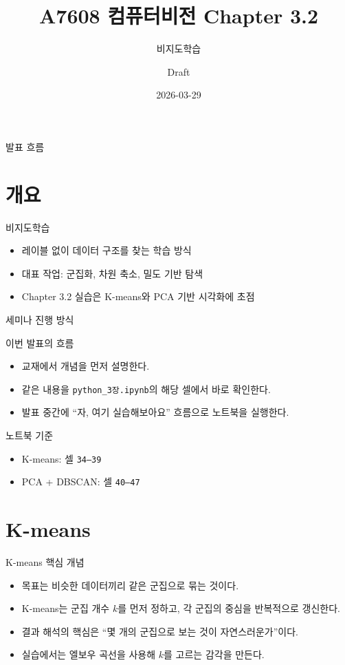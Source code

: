\documentclass[aspectratio=169]{beamer}
\title{A7608 컴퓨터비전 Chapter 3.2}
\subtitle{비지도학습}
\author{Draft}
\date{2026-03-29}
\begin{document}
\frame{\titlepage}

\begin{frame}{발표 흐름}
\tableofcontents
\end{frame}

\section{개요}
\begin{frame}{비지도학습}
\begin{itemize}
    \item 레이블 없이 데이터 구조를 찾는 학습 방식
    \item 대표 작업: 군집화, 차원 축소, 밀도 기반 탐색
    \item Chapter 3.2 실습은 K-means와 PCA 기반 시각화에 초점
\end{itemize}
\end{frame}

\begin{frame}{세미나 진행 방식}
\begin{block}{이번 발표의 흐름}
\begin{itemize}
    \item 교재에서 개념을 먼저 설명한다.
    \item 같은 내용을 \texttt{python\_3장.ipynb}의 해당 셀에서 바로 확인한다.
    \item 발표 중간에 ``자, 여기 실습해보아요'' 흐름으로 노트북을 실행한다.
\end{itemize}
\end{block}
\begin{block}{노트북 기준}
\begin{itemize}
    \item K-means: 셀 \texttt{34--39}
    \item PCA + DBSCAN: 셀 \texttt{40--47}
\end{itemize}
\end{block}
\end{frame}

\section{K-means}
\begin{frame}{K-means 핵심 개념}
\begin{itemize}
    \item 목표는 비슷한 데이터끼리 같은 군집으로 묶는 것이다.
    \item K-means는 군집 개수 \(k\)를 먼저 정하고, 각 군집의 중심을 반복적으로 갱신한다.
    \item 결과 해석의 핵심은 ``몇 개의 군집으로 보는 것이 자연스러운가''이다.
    \item 실습에서는 엘보우 곡선을 사용해 \(k\)를 고르는 감각을 만든다.
\end{itemize}
\end{frame}
\end{document}
